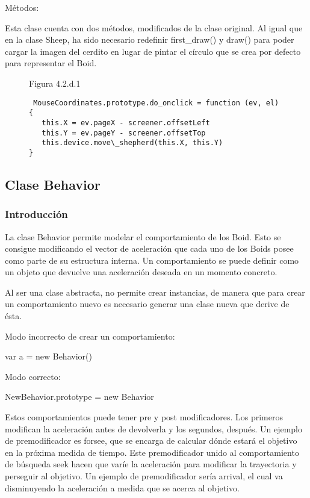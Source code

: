 Métodos:

Esta clase cuenta con dos métodos, modificados de la clase original. Al igual que en la clase Sheep, ha sido necesario redefinir 
first\_draw() y draw() para poder cargar la imagen del cerdito en lugar de pintar el círculo que se crea por defecto para representar el 
Boid.

\begin{figure}
Figura 4.2.d.1
\begin{verbatim}
 MouseCoordinates.prototype.do_onclick = function (ev, el) {
   this.X = ev.pageX - screener.offsetLeft
   this.Y = ev.pageY - screener.offsetTop
   this.device.move\_shepherd(this.X, this.Y)
}
\end{verbatim}
\end{figure}


\subsection{Clase Behavior}
\label{subsection:behavior_section}

\subsubsection{Introducción}
\label{subsubsection:behavior}

La clase Behavior permite modelar el comportamiento de los Boid. Esto se consigue modificando el vector de aceleración que cada uno de los 
Boids posee como parte de su estructura interna. Un comportamiento se puede definir como un objeto que devuelve una aceleración deseada en 
un momento concreto.

Al ser una clase abstracta, no permite crear instancias, de manera que para crear un comportamiento nuevo es necesario generar una clase 
nueva que derive de ésta.

Modo incorrecto de crear un comportamiento:

var a = new Behavior()

Modo correcto:

NewBehavior.prototype = new Behavior

Estos comportamientos puede tener pre y post modificadores. Los primeros modifican la aceleración antes de devolverla y los segundos,
después. Un ejemplo de premodificador es forsee, que se encarga de calcular dónde estará el objetivo en la próxima medida de tiempo. Este 
premodificador unido al comportamiento de búsqueda seek hacen que varíe la aceleración para modificar la trayectoria y perseguir al objetivo. 
Un ejemplo de premodificador sería arrival, el cual va disminuyendo la aceleración a medida que se acerca al objetivo.

